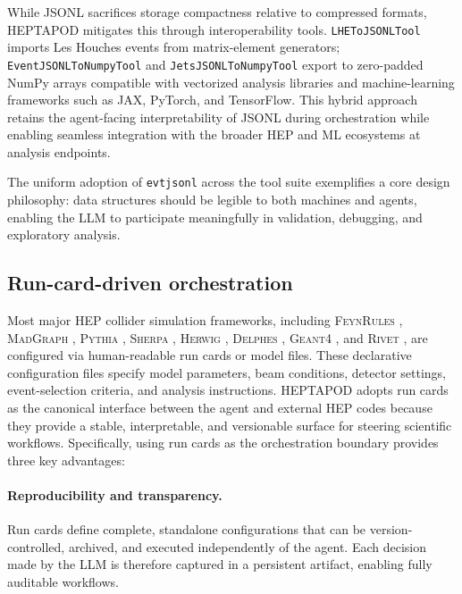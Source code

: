 \documentclass[11pt,oneside]{article}
\numberwithin{equation}{section}
\newcommand{\pkgname}{HEPTAPOD\xspace}
\begin{document}
While JSONL sacrifices storage compactness relative to compressed formats, \pkgname mitigates this through interoperability tools.
\texttt{LHEToJSONLTool} imports Les Houches events from matrix-element generators; \texttt{EventJSONLToNumpyTool} and \texttt{JetsJSONLToNumpyTool} export to zero-padded NumPy arrays compatible with vectorized analysis libraries and machine-learning frameworks such as JAX, PyTorch, and TensorFlow.
This hybrid approach retains the agent-facing interpretability of JSONL during orchestration while enabling seamless integration with the broader HEP and ML ecosystems at analysis endpoints.

The uniform adoption of \texttt{evtjsonl} across the tool suite exemplifies a core design philosophy: data structures should be legible to both machines and agents, enabling the LLM to participate meaningfully in validation, debugging, and exploratory analysis.

\subsection{Run-card-driven orchestration}
\label{subsec:runcards}

Most major HEP collider simulation frameworks, including \textsc{FeynRules} \cite{Alloul:2013bka}, \textsc{MadGraph} \cite{Alwall:2011uj}, \textsc{Pythia} \cite{Bierlich:2022pfr}, \textsc{Sherpa} \cite{Sherpa:2024mfk}, \textsc{Herwig} \cite{Bewick:2023tfi}, \textsc{Delphes} \cite{deFavereau:2013fsa}, \textsc{Geant4} \cite{Allison:2016lfl}, and \textsc{Rivet} \cite{Bierlich:2019rhm}, are configured via human-readable run cards or model files. 
These declarative configuration files specify model parameters, beam conditions, detector settings, event-selection criteria, and analysis instructions. 
\pkgname adopts run cards as the canonical interface between the agent and external HEP codes because they provide a stable, interpretable, and versionable surface for steering scientific workflows.
Specifically, using run cards as the orchestration boundary provides three key advantages:
\paragraph{Reproducibility and transparency.}
Run cards define complete, standalone configurations that can be version-controlled, archived, and executed independently of the agent. Each decision made by the LLM is therefore captured in a persistent artifact, enabling fully auditable workflows.
\end{document}
